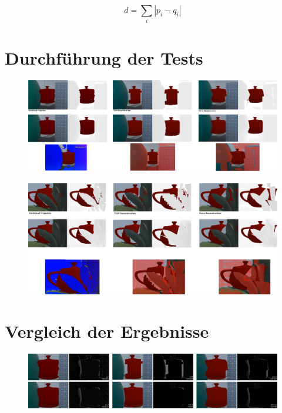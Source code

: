 \begin{equation} \label{eq:diff}
d = \sum_i |p_i-q_i|
\end{equation}

\section{Durchführung der Tests}



\begin{figure}[h]
  \centering
	\includegraphics[width=1.0\textwidth]{content/images/evaluation/static_occlusion.png} 
  \caption{}
  \label{fig:static_occlusion}
\end{figure}

\begin{figure}[h]
  \centering
	\includegraphics[width=1.0\textwidth]{content/images/evaluation/plant_occlusion.png} 
  \caption{}
  \label{fig:plant_occlusion}
\end{figure}

\section{Vergleich der Ergebnisse}

\begin{figure}[h]
  \centering
	\includegraphics[width=1.0\textwidth]{content/images/evaluation/static_occlusion_results.png} 
  \caption{}
  \label{fig:static_occlusion_results}
\end{figure}

